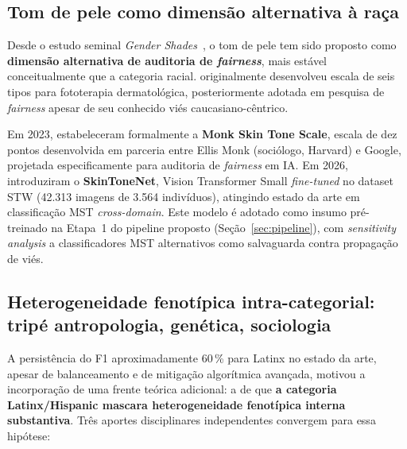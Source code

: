 \subsection{Tom de pele como dimensão alternativa à raça}
\label{sec:rl_skintone}

Desde o estudo seminal \emph{Gender Shades}~\cite{buolamwini2018gender}, o tom de pele tem sido proposto como \textbf{dimensão alternativa de auditoria de \emph{fairness}}, mais estável conceitualmente que a categoria racial.  originalmente desenvolveu escala de seis tipos para fototerapia dermatológica, posteriormente adotada em pesquisa de \emph{fairness} apesar de seu conhecido viés caucasiano-cêntrico.

Em 2023,  estabeleceram formalmente a \textbf{Monk Skin Tone Scale}, escala de dez pontos desenvolvida em parceria entre Ellis Monk (sociólogo, Harvard) e Google, projetada especificamente para auditoria de \emph{fairness} em IA. Em 2026,  introduziram o \textbf{SkinToneNet}, Vision Transformer Small \emph{fine-tuned} no dataset STW (42.313 imagens de 3.564 indivíduos), atingindo estado da arte em classificação MST \emph{cross-domain}. Este modelo é adotado como insumo pré-treinado na Etapa~1 do pipeline proposto (Seção~\ref{sec:pipeline}), com \emph{sensitivity analysis} a classificadores MST alternativos como salvaguarda contra propagação de viés.

\subsection{Heterogeneidade fenotípica intra-categorial: tripé antropologia, genética, sociologia}
\label{sec:rl_latinx}

A persistência do F1 aproximadamente 60\,\% para Latinx no estado da arte, apesar de balanceamento e de mitigação algorítmica avançada, motivou a incorporação de uma frente teórica adicional: a de que \textbf{a categoria Latinx/Hispanic mascara heterogeneidade fenotípica interna substantiva}. Três aportes disciplinares independentes convergem para essa hipótese:

